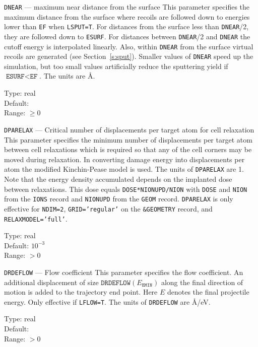 \begin{keydescription}{\texttt{DNEAR} --- maximum near distance from the
    surface}
%
  This parameter specifies the maximum distance from the surface where recoils
  are followed down to energies lower than \texttt{EF} when \texttt{LSPUT=T}. 
  For distances from the surface less than \texttt{DNEAR}/2, they are followed 
  down to \texttt{ESURF}. For distances between \texttt{DNEAR}/2 and
  \texttt{DNEAR} the cutoff energy is interpolated linearly. Also, within 
  \texttt{DNEAR} from the surface virtual recoils are generated
  (see Section~\ref{s:sput}). Smaller values of \texttt{DNEAR} speed up
  the simulation, but too small values artificially reduce the sputtering 
  yield if $\texttt{ESURF} < \texttt{EF}$. The units are \AA.
  \begin{keytab}
    Type:    \> real \\
    Default:  \\
    Range: \> $\ge 0$
  \end{keytab}
\end{keydescription}

\begin{keydescription}{\texttt{DPARELAX} --- Critical number of displacements 
per target atom for cell relaxation}
%
  This parameter specifies the minimum number of displacements per target atom  
  between cell relaxations which is required so that any of the cell
  corners may be moved during relaxation. In converting damage energy into 
  displacements per atom the modified Kinchin-Pease model is used. The units of 
  \texttt{DPARELAX} are 1. Note that the energy density accumulated depends on 
  the implanted dose between relaxations. This dose equals 
  \texttt{DOSE*NIONUPD/NION} with \texttt{DOSE} and \texttt{NION} from the 
  \texttt{IONS} record and \texttt{NIONUPD} from the \texttt{GEOM} record. 
  \texttt{DPARELAX} is only effective for \texttt{NDIM=2}, 
  \texttt{GRID='regular'} on the \texttt{\&GEOMETRY} record, and 
  \texttt{RELAXMODEL='full'}.
  \begin{keytab}
    Type:    \> real \\
    Default: \> $10^{-3}$ \\
    Range:   \> $> 0$
  \end{keytab}
\end{keydescription}

\ifprivate
\begin{keydescription}{\texttt{DRDEFLOW} --- Flow coefficient}
%
  This parameter specifies the flow coefficient. An additional displacement
  of size $\texttt{DRDEFLOW}(E_\texttt{EMIN})$ along the final direction of motion 
  is added to the trajectory end point. Here $E$ denotes the final projectile 
  energy. Only effective if \texttt{LFLOW=T}. The units of \texttt{DRDEFLOW} are
  \AA/eV.
  \begin{keytab}
    Type:    \> real \\
    Default:  \\
    Range:   \> $>0$
  \end{keytab}
\end{keydescription}
\fi

